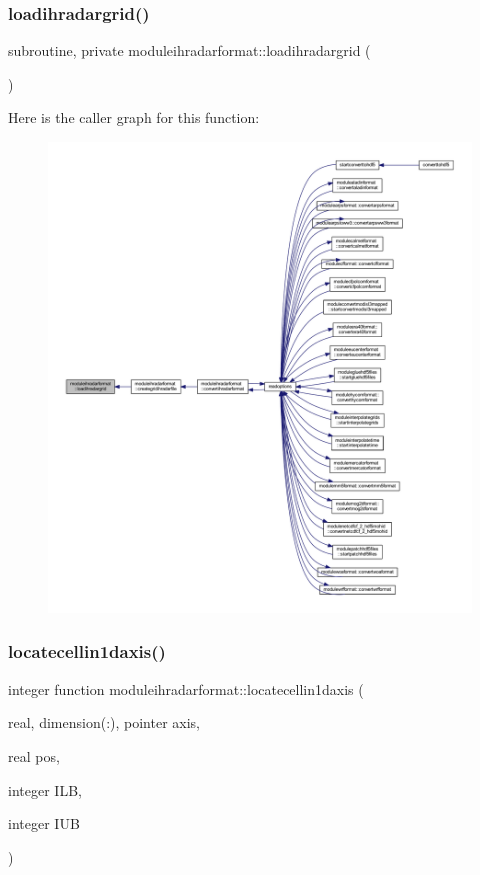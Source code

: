 \subsubsection{\texorpdfstring{loadihradargrid()}{loadihradargrid()}}
{\footnotesize\ttfamily subroutine, private moduleihradarformat\+::loadihradargrid (\begin{DoxyParamCaption}{ }\end{DoxyParamCaption})\hspace{0.3cm}{\ttfamily [private]}}

Here is the caller graph for this function\+:\nopagebreak
\begin{figure}[H]
\begin{center}
\leavevmode
\includegraphics[width=350pt]{namespacemoduleihradarformat_a3b96dd949bf780f8b1d2d5d3818dda48_icgraph}
\end{center}
\end{figure}
\mbox{\label{namespacemoduleihradarformat_a940aa69f596041c70dab62721c97072f}} 
\subsubsection{\texorpdfstring{locatecellin1daxis()}{locatecellin1daxis()}}
{\footnotesize\ttfamily integer function moduleihradarformat\+::locatecellin1daxis (\begin{DoxyParamCaption}\item[{real, dimension(\+:), pointer}]{axis,  }\item[{real}]{pos,  }\item[{integer}]{I\+LB,  }\item[{integer}]{I\+UB }\end{DoxyParamCaption})\hspace{0.3cm}{\ttfamily [private]}}

